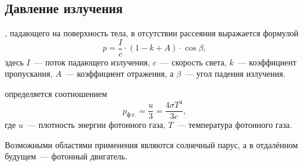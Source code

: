\subsection{Давление излучения}
, падающего на поверхность тела, в отсутствии рассеяния выражается формулой
\begin{equation}
	p = \frac{I}{c} \cdot (1 - k + A) \cdot \cos \beta,
\end{equation}
здесь $I$~--- поток падающего излучения, $c$~--- скорость света, $k$~--- коэффициент пропускания, $A$~--- коэффициент отражения, а $\beta$~--- угол падения излучения.

 определяется соотношением
\begin{equation}
	p_\text{ф.г.} = \frac{u}{3} = \frac{4 \sigma T^4}{3c},
\end{equation}
где $u$~--- плотность энергии фотонного газа, $T$~--- температура фотонного газа.

Возможными областями применения являются солнечный парус, а в отдалённом будущем~--- фотонный двигатель.
